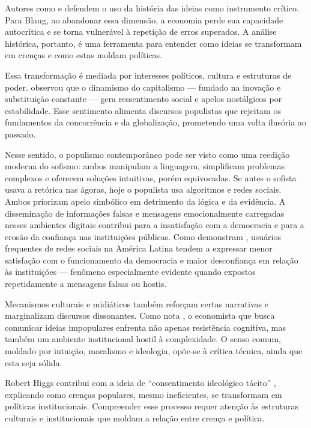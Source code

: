 Autores como  e  defendem o uso da história das ideias como instrumento crítico. Para Blaug, ao abandonar essa dimensão, a economia perde sua capacidade autocrítica e se torna vulnerável à repetição de erros superados. A análise histórica, portanto, é uma ferramenta para entender como ideias se transformam em crenças e como estas moldam políticas.

Essa transformação é mediada por interesses políticos, cultura e estruturas de poder.  observou que o dinamismo do capitalismo — fundado na inovação e substituição constante — gera ressentimento social e apelos nostálgicos por estabilidade. Esse sentimento alimenta discursos populistas que rejeitam os fundamentos da concorrência e da globalização, prometendo uma volta ilusória ao passado.

Nesse sentido, o populismo contemporâneo pode ser visto como uma reedição moderna do sofismo: ambos manipulam a linguagem, simplificam problemas complexos e oferecem soluções intuitivas, porém equivocadas. Se antes o sofista usava a retórica nas ágoras, hoje o populista usa algoritmos e redes sociais. Ambos priorizam apelo simbólico em detrimento da lógica e da evidência. A disseminação de informações falsas e mensagens emocionalmente carregadas nesses ambientes digitais contribui para a insatisfação com a democracia e para a erosão da confiança nas instituições públicas. Como demonstram , usuários frequentes de redes sociais na América Latina tendem a expressar menor satisfação com o funcionamento da democracia e maior desconfiança em relação às instituições — fenômeno especialmente evidente quando expostos repetidamente a mensagens falsas ou hostis.

Mecanismos culturais e midiáticos também reforçam certas narrativas e marginalizam discursos dissonantes. Como nota , o economista que busca comunicar ideias impopulares enfrenta não apenas resistência cognitiva, mas também um ambiente institucional hostil à complexidade. O senso comum, moldado por intuição, moralismo e ideologia, opõe-se à crítica técnica, ainda que esta seja sólida.

Robert Higgs contribui com a ideia de ``consentimento ideológico tácito'' \cite{higgs1987crisis}, explicando como crenças populares, mesmo ineficientes, se transformam em políticas institucionais. Compreender esse processo requer atenção às estruturas culturais e institucionais que moldam a relação entre crença e política.

